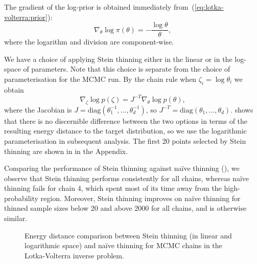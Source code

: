 \documentclass[11pt,a4paper]{report}
\begin{document}
The gradient of the log-prior is obtained immediately from~(\ref{eq:lotka-volterra:prior}):
\begin{equation*}
\nabla_{\theta} \log \pi(\theta) = -\frac{\log \theta}{\theta},
\end{equation*}
where the logarithm and division are component-wise.

We have a choice of applying Stein thinning either in the linear or in the log-space of parameters. Note that this choice is separate from the choice of parameterisation for the MCMC run. By the chain rule when $\zeta_i = \log \theta_i$ we obtain
\begin{equation*}
\nabla_\zeta \log p(\zeta) = J^{-T} \nabla_\theta \log p(\theta),
\end{equation*}
where the Jacobian is $J = \text{diag}(\theta_1^{-1}, \dots, \theta_d^{-1})$, so $J^{-T} =  \text{diag}(\theta_1, \dots, \theta_d)$.
 shows that there is no discernible difference between the two options in terms of the resulting energy distance to the target distribution, so we use the logarithmic parameterisation in subsequent analysis. The first 20 points selected by Stein thinning are shown in  in the Appendix.

Comparing the performance of Stein thinning against na\"ive thinning (), we observe that Stein thinning performs consistently for all chains, whereas na\"ive thinning fails for chain 4, which spent most of its time away from the high-probability region. Moreover, Stein thinning improves on na\"ive thinning for thinned sample sizes below 20 and above 2000 for all chains, and is otherwise similar.

\begin{figure}[t]
\centering
{}
\caption{Energy distance comparison between Stein thinning (in linear and logarithmic space) and na\"ive thinning for MCMC chains in the Lotka-Volterra inverse problem.
\label{fig:lotka-volterra:stein-thinning:energy-distance}}
\end{figure}
\end{document}
